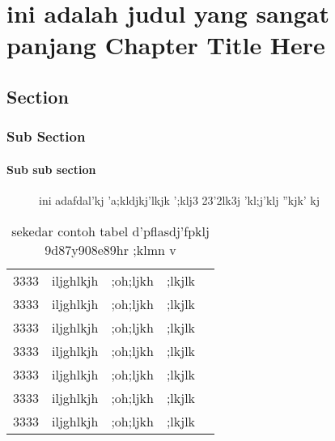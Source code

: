 
\chapter{ini adalah judul yang sangat panjang Chapter Title Here} %


\section{Section}
\subsection{Sub Section}
\subsubsection{Sub sub section}


\ttitle

\begin{figure}[htbp]
\caption{ini adafdal'kj 'a;kldjkj'lkjk ';klj3 23'2lk3j  'kl;j'klj ''kjk' kj }
\end{figure}

\begin{table}[htbp]
\caption{sekedar contoh tabel d'pflasdj'fpklj 9d87y908e89hr ;klmn v}
\begin{tabular}{lllll}
3333 & iljghlkjh & ;oh;ljkh&;lkjlk \\
3333 & iljghlkjh & ;oh;ljkh&;lkjlk \\
3333 & iljghlkjh & ;oh;ljkh&;lkjlk \\
3333 & iljghlkjh & ;oh;ljkh&;lkjlk \\
3333 & iljghlkjh & ;oh;ljkh&;lkjlk \\
3333 & iljghlkjh & ;oh;ljkh&;lkjlk \\
3333 & iljghlkjh & ;oh;ljkh&;lkjlk \\
\end{tabular}
\end{table}

